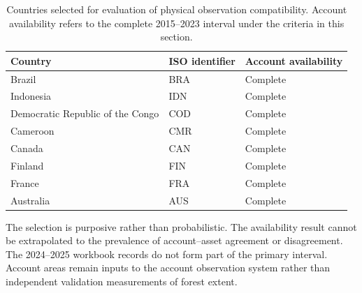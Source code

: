 \documentclass[11pt,a4paper]{article}
\begin{document}
\begin{table}[htbp]
\centering\small
\caption{Countries selected for evaluation of physical observation compatibility. Account availability refers to the complete 2015--2023 interval under the criteria in this section.}\label{tab:countries}
\begin{tabular}{lll}
\toprule
Country & ISO identifier & Account availability\\\midrule
Brazil & BRA & Complete\\
Indonesia & IDN & Complete\\
Democratic Republic of the Congo & COD & Complete\\
Cameroon & CMR & Complete\\
Canada & CAN & Complete\\
Finland & FIN & Complete\\
France & FRA & Complete\\
Australia & AUS & Complete\\\bottomrule
\end{tabular}
\end{table}

The selection is purposive rather than probabilistic. The availability result cannot be extrapolated to the prevalence of account--asset agreement or disagreement. The 2024--2025 workbook records do not form part of the primary interval. Account areas remain inputs to the account observation system rather than independent validation measurements of forest extent.
\end{document}
